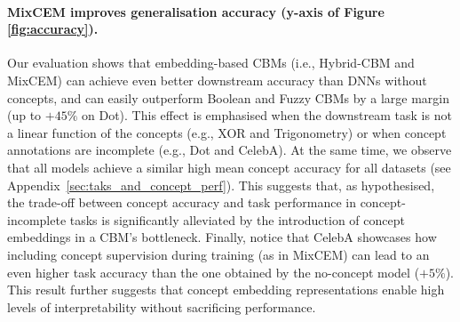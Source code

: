 \paragraph{MixCEM improves generalisation accuracy (y-axis of Figure \ref{fig:accuracy}).}
Our evaluation shows that embedding-based CBMs (i.e., Hybrid-CBM and MixCEM) can achieve even better downstream accuracy than DNNs without concepts, and can easily outperform Boolean and Fuzzy CBMs by a large margin (up to $+45\%$ on Dot). This effect is emphasised when the downstream task is not a linear function of the concepts (e.g., XOR and Trigonometry) or when concept annotations are incomplete (e.g., Dot and CelebA). At the same time, we observe that all models achieve a similar high mean concept accuracy for all datasets (see Appendix~\ref{sec:taks_and_concept_perf}). This suggests that, as hypothesised, the trade-off between concept accuracy and task performance in concept-incomplete tasks is significantly alleviated by the introduction of concept embeddings in a CBM's bottleneck. Finally, notice that CelebA showcases how including concept supervision during training (as in MixCEM) can lead to an even higher task accuracy than the one obtained by the no-concept model ($+5\%$). This result further suggests that concept embedding representations enable high levels of interpretability without sacrificing performance.



